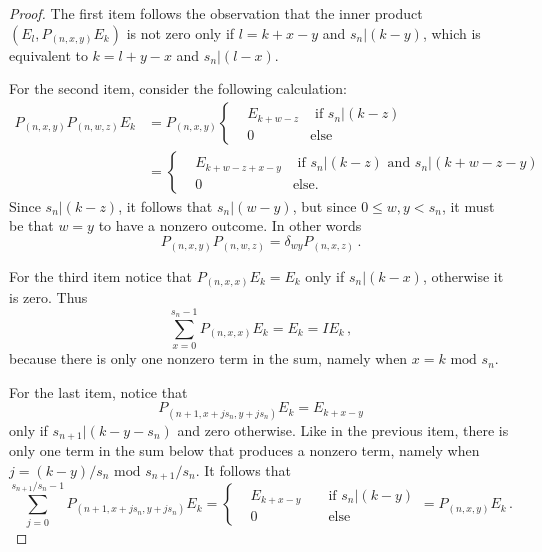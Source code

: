 \documentclass[10pt,a4paper]{amsart}
\begin{document}
\begin{proof}
The first item follows the observation that the inner product $(E_l,P_{(n,x,y)}E_k)$ is not zero only if $l=k+x-y$ and 
$s_n|(k-y)$, which is equivalent to $k=l+y-x$ and $s_n|(l-x)$.

For the second item, consider the following calculation:
\begin{equation*}
\begin{aligned}
P_{(n,x,y)}P_{(n,w,z)}E_k &= P_{(n,x,y)}\left\{
\begin{aligned}
& E_{k+w-z}  &\textrm{ if }s_n|(k-z)\\
&0 &\textrm{else} 
\end{aligned}\right. \\
&= \left\{
\begin{aligned}
& E_{k+w-z+x-y}  &\textrm{ if }s_n|(k-z)\textrm{ and }s_n|(k+w-z-y)\\
&0 &\textrm{else.} 
\end{aligned}\right.
\end{aligned}
\end{equation*}
Since $s_n|(k-z)$, it follows that $s_n|(w-y)$, but since $0\le w,y<s_n$, it must be that $w=y$ to have a nonzero outcome.  In other words
\begin{equation*}
P_{(n,x,y)}P_{(n,w,z)} = \delta_{wy}P_{(n,x,z)}\,.
\end{equation*}

For the third item notice that $P_{(n,x,x)}E_k = E_k$ only if $s_n|(k-x)$, otherwise it is zero.  Thus
\begin{equation*}
\sum_{x=0}^{s_n-1}P_{(n,x,x)}E_k = E_k = IE_k\,,
\end{equation*}
because there is only one nonzero term in the sum, namely when $x = k\textrm{ mod }s_n$.

For the last item, notice that
\begin{equation*}P_{(n+1,x+js_n,y+js_n)}E_k= E_{k+x-y}
\end{equation*}
only if $s_{n+1}|(k-y-s_n)$ and zero otherwise.   Like in the previous item, there is only one term in the sum below that produces a nonzero term, namely when $j=(k-y)/s_n\textrm{ mod }s_{n+1}/s_n$.  It follows that
\begin{equation*}
\sum_{j=0}^{s_{n+1}/s_n-1}P_{(n+1,x+js_n,y+js_n)}E_k=\left\{
\begin{aligned}
& E_{k+x-y} &&\textrm{ if }s_n|(k-y) \\
&0 &&\textrm{ else}
\end{aligned}\right. = P_{(n,x,y)}E_k\,.
\end{equation*}
\end{proof}
\end{document}
